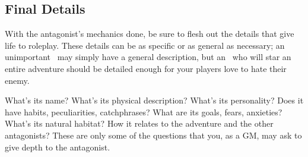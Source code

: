 \begin{multicols}{2}
\subsection{Final Details}\label{gm-findet}
With the antagonist’s mechanics done, be sure to flesh out the details that give life to roleplay. These details can be as specific or as general as necessary; an unimportant \tmobmini{}\ may simply have a general description, but an \tmobleet{}\ who will star an entire adventure should be detailed enough for your players love to hate their enemy.

What's its name? What’s its physical description? What’s its personality? Does it have habits, peculiarities, catchphrases? What are its goals, fears, anxieties? What’s its natural habitat? How it relates to the adventure and the other antagonists? These are only some of the questions that you, as a GM, may ask to give depth to the antagonist.
\end{multicols}
%
%
%
%
%
